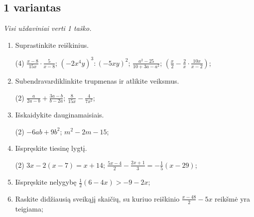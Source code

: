\documentclass[a4paper]{article}
\begin{document}
\vspace*{12mm}

\subsection*{1 variantas}

\textit{Visi uždaviniai verti 1 taško.}


\begin{enumerate}
      \item Suprastinkite reiškinius.
            \begin{tasks}[item-format={\normalfont}, after-item-skip=2mm](4)
                  \task $\frac{x-8}{15x}\cdot \frac{5}{x-8}$;
                  \task $(-2x^4y)^3:(-5xy)^2$;
                  \task $\frac{a^2-25}{10+3a-a^2}$;
                  \task $(\frac{x}{2}-\frac{2}{x}\cdot \frac{10x}{x-2})$;
            \end{tasks}

      \item Subendravardiklinkite trupmenas ir atlikite veiksmus.
            \begin{tasks}[item-format={\normalfont}, after-item-skip=2mm](2)
                  \task $\frac{a}{2a-b}+\frac{3a-b}{b-2a}$;
                  \task $\frac{8}{15x}-\frac{4}{7x^2}$;
            \end{tasks}

      \item Išskaidykite dauginamaisiais.
            \begin{tasks}[item-format={\normalfont}, after-item-skip=2mm](2)
                  \task $-6ab+9b^2$;
                  \task $m^2-2m-15$;
            \end{tasks}

      \item Išspręskite tiesinę lygtį.
            \begin{tasks}[item-format={\normalfont}, after-item-skip=2mm](2)
                  \task $3x-2(x-7)=x+14$;
                  \task $\frac{5x-4}{2}-\frac{2x+1}{3}=-\frac{1}{5}(x-29)$;
            \end{tasks}

      \item Išspręskite nelygybę $\frac{1}{2}(6-4x)>-9-2x$;
      \item Raskite didžiausią sveikąjį skaičių, su kuriuo reiškinio $\frac{x-48}{2}-5x$
            reikšmė yra teigiama;
\end{enumerate}

\vspace*{12mm}
\end{document}
